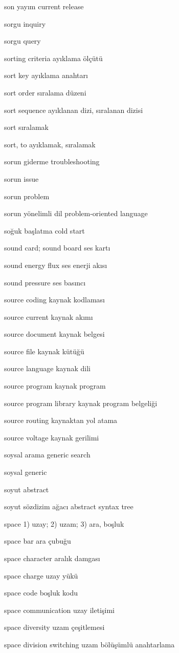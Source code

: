 \documentclass[12pt,fleqn]{article}\usepackage{../../common}
\begin{document}
son yayım current release

sorgu inquiry

sorgu query

sorting criteria ayıklama ölçütü

sort key ayıklama anahtarı

sort order sıralama düzeni

sort sequence ayıklanan dizi, sıralanan dizisi

sort sıralamak

sort, to ayıklamak, sıralamak

sorun giderme troubleshooting

sorun issue

sorun problem

sorun yönelimli dil problem-oriented language

soğuk başlatma cold start

sound card; sound board ses kartı

sound energy flux ses enerji akısı

sound pressure ses basıncı

source coding kaynak kodlaması

source current kaynak akımı

source document kaynak belgesi

source file kaynak kütüğü

source language kaynak dili

source program kaynak program

source program library kaynak program belgeliği

source routing kaynaktan yol atama

source voltage kaynak gerilimi

soysal arama generic search

soysal generic

soyut abstract

soyut sözdizim ağacı abstract syntax tree

space 1) uzay; 2) uzam; 3) ara, boşluk

space bar ara çubuğu

space character aralık damgası

space charge uzay yükü

space code boşluk kodu

space communication uzay iletişimi

space diversity uzam çeşitlemesi

space division switching uzam bölüşümlü anahtarlama
\end{document}

